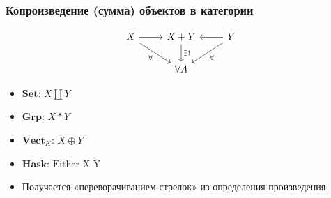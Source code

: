 \documentclass{beamer}
\begin{document}
\begin{frame}[fragile]
\frametitle{Копроизведение (сумма) объектов в категории}
\begin{equation}
\begin{tikzcd}
X \arrow{r} \arrow{dr}[swap]{\forall} & X+Y \arrow{d}{\exists!} & \arrow{l} Y \arrow{dl}{\forall} \\
& \forall A 
\end{tikzcd}
\end{equation}
\begin{itemize}
\pause
\item \begin{math}\mathbf{Set}\end{math}: \begin{math}X \coprod Y\end{math}
\pause
\item \begin{math}\mathbf{Grp}\end{math}: \begin{math}X * Y\end{math}
\pause
\item \begin{math}\mathbf{Vect}_K\end{math}: \begin{math}X \oplus Y\end{math}
\pause
\item \begin{math}\mathbf{Hask}\end{math}: \begin{math}\text{Either X Y}\end{math}
\pause
\item Получается «переворачиванием стрелок» из определения произведения
\end{itemize}
\end{frame}
\end{document}
